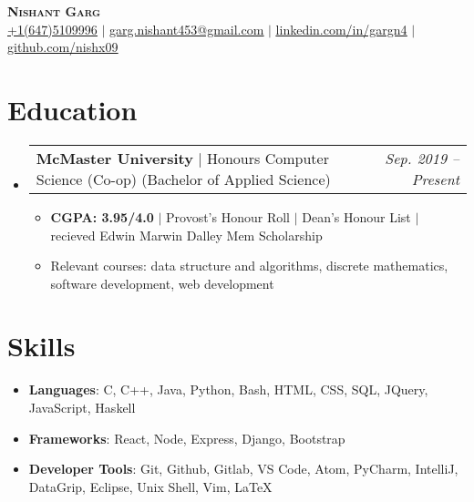 \documentclass[letterpaper,11pt]{article}
\makeatletter
\newcommand{\resumeItem}[1]{
  \item\small{
    {#1 \vspace{-2pt}}
  }
}
\newcommand{\resumeSubheading}[2]{
  \vspace{-2pt}\item
    \begin{tabular*}{0.97\textwidth}[t]{l@{\extracolsep{\fill}}r}
      #1 & #2 \\
    \end{tabular*}\vspace{-7pt}
}
\newcommand{\resumeSubHeadingListStart}{\begin{itemize}[leftmargin=0.15in, label={}]}
\newcommand{\resumeSubHeadingListEnd}{\end{itemize}}
\newcommand{\resumeItemListStart}{\begin{itemize}}
\newcommand{\resumeItemListEnd}{\end{itemize}\vspace{-5pt}}
\makeatother
\begin{document}
\begin{center}
    \textbf{\Huge \scshape Nishant Garg} \\ \vspace{1pt}
    \small \href{tel:16475109996}{\underline{+1(647)5109996}} $|$
    \href{mailto:garg.nishant453@gmail.com}{\underline{garg.nishant453@gmail.com}} $|$ 
    \href{https://www.linkedin.com/in/gargn4}{\underline{linkedin.com/in/gargn4}} $|$
    \href{https://github.com/nishx09}{\underline{github.com/nishx09}}
\end{center}

\section{Education}
  \resumeSubHeadingListStart
    \resumeSubheading
      {\textbf{McMaster University} $|$ \small Honours Computer Science (Co-op) (Bachelor of Applied Science) }{\textit{\small Sep. 2019 -- Present}}
      {}{}
      \resumeItemListStart
        \resumeItem{\textbf{CGPA: 3.95/4.0} $|$ Provost's Honour Roll $|$ Dean's Honour List $|$ recieved Edwin Marwin Dalley Mem Scholarship}
        \resumeItem{Relevant courses: data structure and algorithms, discrete mathematics, software development, web development}
    \resumeItemListEnd
  \resumeSubHeadingListEnd

\section{Skills}
 \begin{itemize}[leftmargin=0.15in, label={}]
    \small \item \textbf{Languages}{: \small  C, C++, Java, Python, Bash, HTML, CSS, SQL, JQuery, JavaScript, Haskell} \\
    \vspace{0.0001cm}
    \small \item \textbf{Frameworks}{: React, Node, Express, Django, Bootstrap} \\
    \vspace{0.0001cm}
    \small \item \textbf{Developer Tools}{: Git, Github, Gitlab, VS Code, Atom, PyCharm, IntelliJ, DataGrip, Eclipse, Unix Shell, Vim, \LaTeX} \\
    
 \end{itemize}
\end{document}
